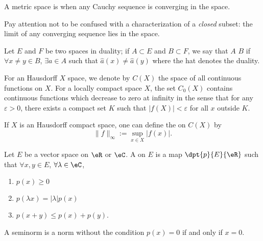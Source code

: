 \begin{definition}
A metric space is  when any Cauchy sequence is converging in the space.
\end{definition}

Pay attention not to be confused with a characterization of a \emph{closed} subset: the limit of any converging sequence lies in the space.

\begin{definition}\label{def:separe}
Let $E$ and $F$ be two spaces in duality; if $A\subset E$ and $B\subset F$, we say that $A$  $B$ if $\forall x\neq y\in B$, $\exists a\in A$ such that $\hat{a}(x)\neq\hat{a}(y)$ where the hat denotes the duality.
\end{definition}

For an Hausdorff $X$ space, we denote by $C(X)$\label{pg_def_Cz } the space of all continuous functions on $X$. For a locally compact space $X$, the set $C_0(X)$ contains continuous functions which decrease to zero at infinity in the sense that for any $\varepsilon>0$, there exists a compact set $K$ such that $|f(X)|<\varepsilon$ for all $x$ outside $K$.

\begin{definition}
If $X$ is an Hausdorff compact space, one can define the  on $C(X)$ by
\begin{equation}
   \|f\|_{\infty}:=\sup_{x\in X}|f(x)|.
\end{equation}
\label{def:sup_norm}
\end{definition}

\begin{definition}
Let $E$ be a vector space on $\eR$ or $\eC$. A  on $E$ is a map $\dpt{p}{E}{\eR}$ such that $\forall x,y\in E$, $\forall\lambda\in\eC$,
\begin{enumerate}
\item $p(x)\geq 0$
\item $p(\lambda x)=|\lambda|p(x)$
\item $p(x+y)\leq p(x)+p(y)$.
\end{enumerate}
\end{definition}
A seminorm is a norm without the condition  $p(x)=0$ if and only if $x=0$.

